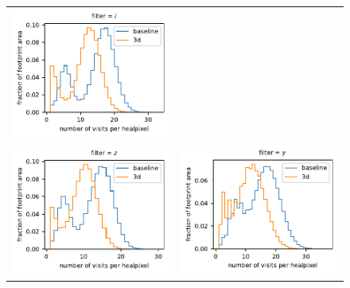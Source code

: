 \documentclass[preprintm,linenumbers]{aastex631}
\begin{document}
\begin{figure}
\begin{tabular}{@{}c@{}c@{}}
				\includegraphics{results/histograms/hist_first_year_one_snap_v4_0_10yrs_db_noDD_noTwi_CountMetric_doAllTemplateMetrics_reduceCount_i_3_noDD_noTwi.pdf} \\
				 \includegraphics{results/histograms/hist_first_year_one_snap_v4_0_10yrs_db_noDD_noTwi_CountMetric_doAllTemplateMetrics_reduceCount_z_3_noDD_noTwi.pdf} &
				\includegraphics{results/histograms/hist_first_year_one_snap_v4_0_10yrs_db_noDD_noTwi_CountMetric_doAllTemplateMetrics_reduceCount_y_3_noDD_noTwi.pdf} \\
    			

\end{tabular}
\end{figure}
\end{document}
